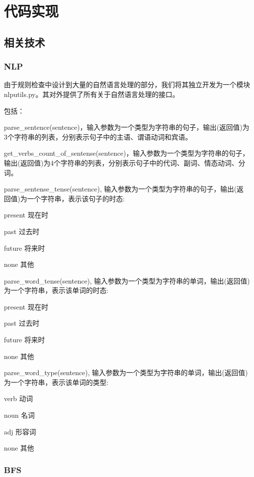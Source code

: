 \chapter{代码实现}

\section{相关技术}
    \subsection{NLP}

        由于规则检查中设计到大量的自然语言处理的部分，我们将其独立开发为一个模块nlputils.py。其对外提供了所有关于自然语言处理的接口。

        包括：
        
        parse\_sentence(sentence)，输入参数为一个类型为字符串的句子，输出(返回值)为3个字符串的列表，分别表示句子中的主语、谓语动词和宾语。
        
        get\_verbs\_count\_of\_sentense(sentence)，输入参数为一个类型为字符串的句子，输出(返回值)为4个字符串的列表，分别表示句子中的代词、副词、情态动词、分词。
        
        parse\_sentense\_tense(sentence),
        输入参数为一个类型为字符串的句子，输出(返回值)为一个字符串，表示该句子的时态:
        
        present 现在时
        
        past 过去时
        
        future 将来时
        
        none 其他
        
        parse\_word\_tense(sentence),
        输入参数为一个类型为字符串的单词，输出(返回值)为一个字符串，表示该单词的时态:
        
        present 现在时
        
        past 过去时
        
        future 将来时
        
        none 其他
        
        parse\_word\_type(sentence),
        输入参数为一个类型为字符串的单词，输出(返回值)为一个字符串，表示该单词的类型:
        
        verb 动词
        
        noun 名词
        
        adj 形容词
        
        none 其他

    \subsection{BFS}


